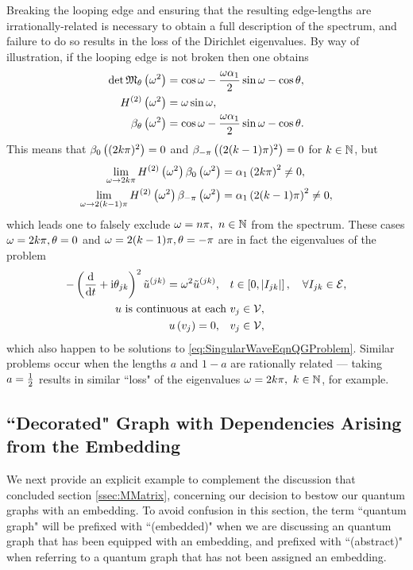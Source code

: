 Breaking the looping edge and ensuring that the resulting edge-lengths are irrationally-related is necessary to obtain a full description of the spectrum, and failure to do so results in the loss of the Dirichlet eigenvalues.
By way of illustration, if the looping edge is not broken then one obtains
\begin{align*}
	\det\mathfrak{M}_{\theta}\left( \omega^2 \right) &= \cos\omega - \frac{\omega\alpha_1}{2}\sin\omega - \cos\theta, \\
	H^{(2)}\left( \omega^2 \right) &= \omega\sin\omega, \\
	\beta_{\theta}\left( \omega^2 \right) &= \cos\omega - \frac{\omega\alpha_1}{2}\sin\omega - \cos\theta.
\end{align*}
This means that $\beta_{0}\left( (2k\pi)^2 \right)=0$ and $\beta_{-\pi}\left( (2(k-1)\pi)^2 \right)=0$ for $k\in\mathbb{N}$, but 
\begin{align*}
	\lim_{\omega\rightarrow 2k\pi}H^{(2)}\left( \omega^2 \right)\beta_{0}\left( \omega^2 \right) &= \alpha_1\left( 2k\pi \right)^2 \neq 0, \\
	\lim_{\omega\rightarrow 2(k-1)\pi} H^{(2)}\left( \omega^2 \right)\beta_{-\pi}\left( \omega^2 \right) &= \alpha_1\left( 2(k-1)\pi \right)^2 \neq 0,
\end{align*}
which leads one to falsely exclude $\omega=n\pi, \ n\in\mathbb{N}$ from the spectrum.
These cases $\omega=2k\pi, \theta=0$ and $\omega=2(k-1)\pi, \theta=-\pi$ are in fact the eigenvalues of the problem
\begin{align*}
	-\left( \dfrac{\mathrm{d}}{\mathrm{d}t} + \mathrm{i}\theta_{jk} \right)^2 \tilde{u}^{(jk)} = \omega^2 \tilde{u}^{(jk)}, \quad &t\in\left[ 0,\left\lvert I_{jk} \right\rvert \right], \quad \forall I_{jk}\in \mathcal{E}, \\
	u \text{ is continuous at each } &v_j \in \mathcal{V}, \\
	u\left( v_j \right) = 0, \quad &v_j\in\mathcal{V},
\end{align*}
which also happen to be solutions to \eqref{eq:SingularWaveEqnQGProblem}.
Similar problems occur when the lengths $a$ and $1-a$ are rationally related --- taking $a=\frac{1}{2}$ results in similar ``loss" of the eigenvalues $\omega=2k\pi, \ k\in\naturals$, for example.

\subsection{``Decorated" Graph with Dependencies Arising from the Embedding} \label{ssec:EmbeddingDependentExample}
We next provide an explicit example to complement the discussion that concluded section \ref{ssec:MMatrix}, concerning our decision to bestow our quantum graphs with an embedding. 
To avoid confusion in this section, the term ``quantum graph" will be prefixed with ``(embedded)" when we are discussing an quantum graph that has been equipped with an embedding, and prefixed with ``(abstract)" when referring to a quantum graph that has not been assigned an embedding.


